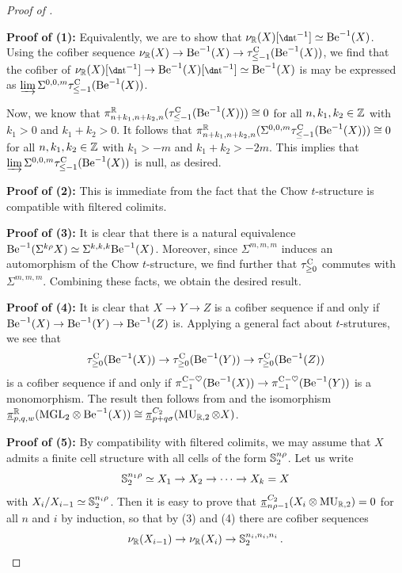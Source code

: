 \begin{proof}[Proof of ] \

  \textbf{Proof of (1):} Equivalently, we are to show that $\nur(X)[\ta^{-1}] \simeq \b^{-1} (X)$.
  Using the cofiber sequence $\nu_{\mathbb{R}}(X) \to \mathrm{Be}^{-1} (X) \to \tau_{\leq -1} ^{\mathrm{C}} (\mathrm{Be}^{-1} (X))$, we find that the cofiber of $\nur(X) [\ta^{-1}] \to \b^{-1} (X)[\ta^{-1}] \simeq \b^{-1} (X)$ is may be expressed as $\varinjlim \Sigma^{0,0,m} \tau_{\leq -1} ^{\mathrm{C}} (\mathrm{Be}^{-1} (X))$.

  Now, we know that $\pi_{n+k_1, n+k_2, n} ^{\mathbb{R}} (\tau_{\leq -1} ^{\mathrm{C}} (\mathrm{Be}^{-1} (X))) \cong 0$ for all $n,k_1,k_2 \in \mathbb{Z}$ with $k_1 > 0$ and $k_1+k_2 > 0$.
  It follows that $\pi_{n+k_1, n+k_2, n} ^{\mathbb{R}} ( \Sigma^{0,0,m} \tau_{\leq -1} ^{\mathrm{C}} (\mathrm{Be}^{-1} (X))) \cong 0$ for all $n,k_1,k_2 \in \mathbb{Z}$ with $k_1 > -m$ and $k_1+k_2 > -2m$.
  This implies that $\varinjlim \Sigma^{0,0,m} \tau_{\leq -1} ^{\mathrm{C}} (\mathrm{Be}^{-1} (X))$ is null, as desired.

  \textbf{Proof of (2):} This is immediate from the fact that the Chow $t$-structure is compatible with filtered colimits.

  \textbf{Proof of (3):} It is clear that there is a natural equivalence $\mathrm{Be}^{-1} (\Sigma^{k\rho} X) \simeq \Sigma^{k,k,k} \mathrm{Be}^{-1} (X)$.
  Moreover, since $\Sigma^{m,m,m}$ induces an automorphism of the Chow $t$-structure, we find further that $\tau_{\geq 0} ^{\mathrm{C}}$ commutes with $\Sigma^{m,m,m}$.
  Combining these facts, we obtain the desired result.

  \textbf{Proof of (4):} It is clear that $X \to Y \to Z$ is a cofiber sequence if and only if $\mathrm{Be}^{-1} (X) \to \mathrm{Be}^{-1} (Y) \to \mathrm{Be}^{-1} (Z)$ is.
  Applying a general fact about $t$-strutures, we see that
  \[\tau_{\geq 0} ^{\mathrm{C}} (\mathrm{Be}^{-1} (X)) \to \tau_{\geq 0} ^{\mathrm{C}} (\mathrm{Be}^{-1} (Y)) \to \tau_{\geq 0} ^{\mathrm{C}} (\mathrm{Be}^{-1} (Z)) \]
  is a cofiber sequence if and only if $\pi_{-1} ^{\mathrm{C}-\heartsuit} (\mathrm{Be}^{-1} (X)) \to \pi_{-1} ^{\mathrm{C}-\heartsuit} (\mathrm{Be}^{-1} (Y))$ is a monomorphism.
  The result then follows from  and the isomorphism $\underline{\pi}_{p,q,w} ^{\mathbb{R}} (\mathrm{MGL}_2 \otimes \mathrm{Be}^{-1} (X)) \cong \underline{\pi}_{p+q\sigma} ^{C_2} (\operatorname{\mathrm{MU}}_{\mathbb{R}, 2} \otimes X)$.

  \textbf{Proof of (5):} By compatibility with filtered colimits, we may assume that $X$ admits a finite cell structure with all cells of the form $\operatorname{\mathbb{S}}_2^{n\rho}$. Let us write
  \[\operatorname{\mathbb{S}}_2^{n_1 \rho} \simeq X_1 \to X_2 \to \dots \to X_k = X\]
  with $X_i / X_{i-1} \simeq \operatorname{\mathbb{S}}_2^{n_i \rho}$.
  Then it is easy to prove that $\underline{\pi}_{n\rho-1} ^{C_2} (X_i \otimes \operatorname{\mathrm{MU}}_{\mathbb{R}, 2}) = 0$ for all $n$ and $i$ by induction, so that by (3) and (4) there are cofiber sequences
  \[\nu_{\mathbb{R}} (X_{i-1}) \to \nu_{\mathbb{R}} (X_i) \to \operatorname{\mathbb{S}}_2^{n_i, n_i, n_i}.\]


\end{proof}
